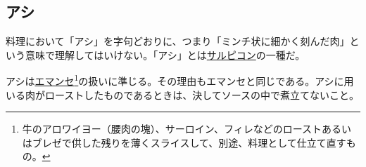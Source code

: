 

\hypertarget{hachis}{%
\subsection{アシ}\label{hachis}}

料理において「アシ」を字句どおりに、つまり「ミンチ状に細かく刻んだ肉」という意味で理解してはいけない。「アシ」とは\protect\hyperlink{salpicons-divers}{サルピコン}の一種だ。

アシは\protect\hyperlink{eminces}{エマンセ}\footnote{牛のアロワイヨー（腰肉の塊）、サーロイン、フィレなどのローストあるいはブレゼで供した残りを薄くスライスして、別途、料理として仕立て直すもの。}の扱いに準じる。その理由もエマンセと同じである。アシに用いる肉がローストしたものであるときは、決してソースの中で煮立てないこと。

